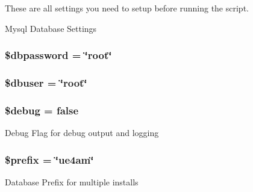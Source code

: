 These are all settings you need to setup before running the script. 

Mysql Database Settings \hypertarget{settings_8php_a0d42c2db361e096182a30d694e0cd6e4}{
\subsubsection[{\$dbpassword}]{\setlength{\rightskip}{0pt plus 5cm}\$dbpassword = \char`\"{}root\char`\"{}}}\label{settings_8php_a0d42c2db361e096182a30d694e0cd6e4}
\hypertarget{settings_8php_a8d5ac1c3396a540f025f9bbe56a5b568}{
\subsubsection[{\$dbuser}]{\setlength{\rightskip}{0pt plus 5cm}\$dbuser = \char`\"{}root\char`\"{}}}\label{settings_8php_a8d5ac1c3396a540f025f9bbe56a5b568}
\hypertarget{settings_8php_a85ae3e64cd40e9564adceb010085e9dd}{
\subsubsection[{\$debug}]{\setlength{\rightskip}{0pt plus 5cm}\$debug = false}}\label{settings_8php_a85ae3e64cd40e9564adceb010085e9dd}
Debug Flag for debug output and logging \hypertarget{settings_8php_a09e8cf95b9d29955a0bfabca9b420edc}{
\subsubsection[{\$prefix}]{\setlength{\rightskip}{0pt plus 5cm}\$prefix = \char`\"{}ue4am\char`\"{}}}\label{settings_8php_a09e8cf95b9d29955a0bfabca9b420edc}
Database Prefix for multiple installs 